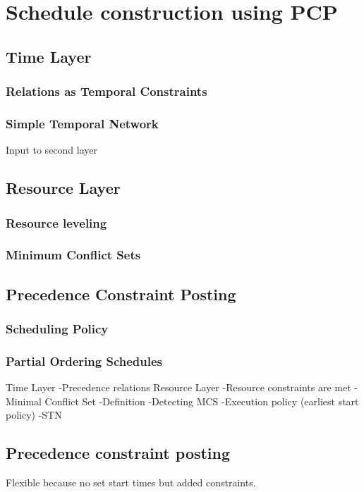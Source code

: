 \documentclass{article}
\begin{document}
\section{Schedule construction using PCP}
\subsection{Time Layer}
\subsubsection{Relations as Temporal Constraints}
\subsubsection{Simple Temporal Network}
Input to second layer

\subsection{Resource Layer}
\subsubsection{Resource leveling}
\subsubsection{Minimum Conflict Sets}

\subsection{Precedence Constraint Posting}
\subsubsection{Scheduling Policy}
\subsubsection{Partial Ordering Schedules}

Time Layer
-Precedence relations
Resource Layer
-Resource constraints are met
-Minimal Conflict Set
	-Definition
-Detecting MCS
	-Execution policy (earliest start policy)
	-STN

\subsection{Precedence constraint posting}
Flexible because no set start times but added constraints.
\end{document}
